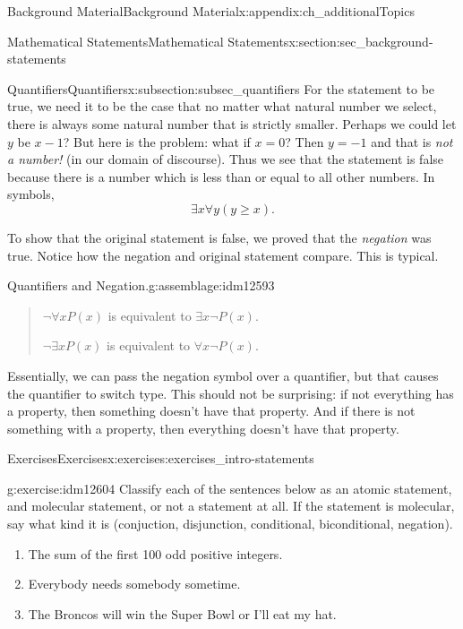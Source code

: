 \documentclass[oneside,10pt,]{book}
\numberwithin{equation}{chapter}
\begin{document}
\begin{appendixptx}{Background Material}{}{Background Material}{}{}{x:appendix:ch_additionalTopics}
\begin{sectionptx}{Mathematical Statements}{}{Mathematical Statements}{}{}{x:section:sec_background-statements}
\begin{subsectionptx}{Quantifiers}{}{Quantifiers}{}{}{x:subsection:subsec_quantifiers}
For the statement to be true, we need it to be the case that no matter what natural number we select, there is always some natural number that is strictly smaller. Perhaps we could let \(y\) be \(x-1\)? But here is the problem: what if \(x = 0\)? Then \(y = -1\) and that is \emph{not a number!} (in our domain of discourse). Thus we see that the statement is false because there is a number which is less than or equal to all other numbers. In symbols,%
\begin{equation*}
\exists x \forall y (y \ge x).
\end{equation*}
%
\par
To show that the original statement is false, we proved that the \emph{negation} was true. Notice how the negation and original statement compare. This is typical.%
\begin{assemblage}{Quantifiers and Negation.}{g:assemblage:idm12593}%
\begin{quote}%
\(\neg \forall x P(x)\) is equivalent to \(\exists x \neg P(x)\).%
\par
\(\neg \exists x P(x)\) is equivalent to \(\forall x \neg P(x)\).%
\end{quote}
\end{assemblage}
Essentially, we can pass the negation symbol over a quantifier, but that causes the quantifier to switch type. This should not be surprising: if not everything has a property, then something doesn't have that property. And if there is not something with a property, then everything doesn't have that property.%
\end{subsectionptx}
%
%
\typeout{************************************************}
\typeout{************************************************}
%
\begin{exercises-subsection}{Exercises}{}{Exercises}{}{}{x:exercises:exercises_intro-statements}
\begin{divisionexercise}{1}{}{}{g:exercise:idm12604}%
Classify each of the sentences below as an atomic statement, and molecular statement, or not a statement at all.  If the statement is molecular, say what kind it is (conjuction, disjunction, conditional, biconditional, negation).%
\begin{enumerate}[label=(\alph*)]
\item{}The sum of the first 100 odd positive integers.%
\item{}Everybody needs somebody sometime.%
\item{}The Broncos will win the Super Bowl or I'll eat my hat.%

\end{enumerate}
\end{divisionexercise}
\end{exercises-subsection}
\end{sectionptx}
\end{appendixptx}
\end{document}
